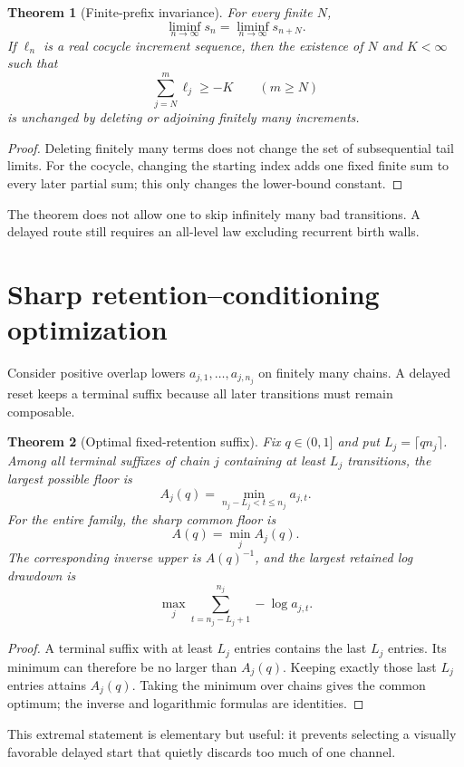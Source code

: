 \documentclass[12pt]{article}
\newtheorem{theorem}{Theorem}
\begin{document}
\begin{theorem}[Finite-prefix invariance]\label{thm:prefix}
For every finite $N$,
\[
 \liminf_{n\to\infty}s_n=\liminf_{n\to\infty}s_{n+N}.
\]
If $\ell_n$ is a real cocycle increment sequence, then the existence of
$N$ and $K<\infty$ such that
\[
 \sum_{j=N}^{m}\ell_j\geq-K\qquad(m\geq N)
\]
is unchanged by deleting or adjoining finitely many increments.
\end{theorem}
\begin{proof}
Deleting finitely many terms does not change the set of subsequential tail
limits.  For the cocycle, changing the starting index adds one fixed finite
sum to every later partial sum; this only changes the lower-bound constant.
\end{proof}

The theorem does not allow one to skip infinitely many bad transitions.  A
delayed route still requires an all-level law excluding recurrent birth
walls.

\section{Sharp retention--conditioning optimization}
Consider positive overlap lowers
$a_{j,1},\ldots,a_{j,n_j}$ on finitely many chains.  A delayed reset keeps a
terminal suffix because all later transitions must remain composable.

\begin{theorem}[Optimal fixed-retention suffix]\label{thm:suffix}
Fix $q\in(0,1]$ and put $L_j=\lceil qn_j\rceil$.  Among all terminal suffixes
of chain $j$ containing at least $L_j$ transitions, the largest possible
floor is
\[
 A_j(q)=\min_{n_j-L_j<t\leq n_j}a_{j,t}.
\]
For the entire family, the sharp common floor is
\[
 A(q)=\min_j A_j(q).
\]
The corresponding inverse upper is $A(q)^{-1}$, and the largest retained
log drawdown is
\[
 \max_j\sum_{t=n_j-L_j+1}^{n_j}-\log a_{j,t}.
\]
\end{theorem}
\begin{proof}
A terminal suffix with at least $L_j$ entries contains the last $L_j$
entries.  Its minimum can therefore be no larger than $A_j(q)$.  Keeping
exactly those last $L_j$ entries attains $A_j(q)$.  Taking the minimum over
chains gives the common optimum; the inverse and logarithmic formulas are
identities.
\end{proof}

This extremal statement is elementary but useful: it prevents selecting a
visually favorable delayed start that quietly discards too much of one
channel.
\end{document}
